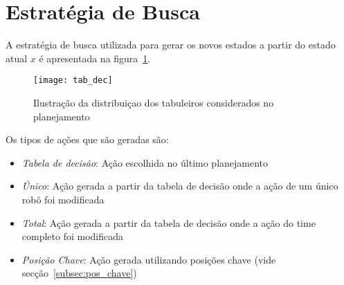 \section{Estratégia de Busca}\label{sec:est_busca}
A estratégia de busca utilizada para gerar os novos
estados a partir do estado atual $x$ é apresentada na
figura~\ref{fig:estr_busca}.

\begin{figure}[H]
  \centering
  \texttt{[image: tab\_dec]}
  \caption{Ilustração da distribuiçao dos tabuleiros
           considerados no planejamento}\label{fig:estr_busca}
\end{figure}

Os tipos de ações que são geradas são:
\begin{itemize}
  \item \textit{Tabela de decisão}: Ação escolhida no último planejamento
  \item \textit{Único}: Ação gerada a partir da tabela de decisão
        onde a ação de um único robô foi modificada
  \item \textit{Total}: Ação gerada a partir da tabela de decisão
        onde a ação do time completo foi modificada
  \item \textit{Posição Chave}: Ação gerada utilizando posições chave
        (vide secção~\ref{subsec:pos_chave})
\end{itemize}




